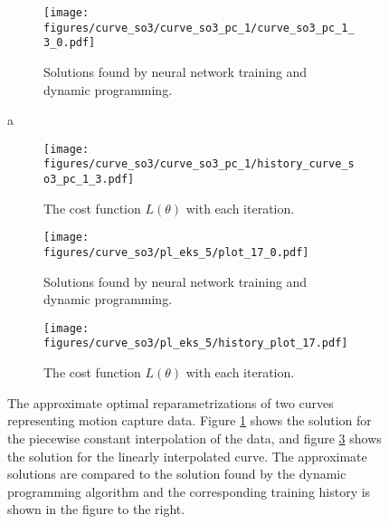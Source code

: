 

\begin{figure}[t]\label{fig:curve_1_so3_example}
    \begin{subfigure}[t]{0.5\textwidth}
        \centering
        \texttt{[image: figures/curve\_so3/curve\_so3\_pc\_1/curve\_so3\_pc\_1\_3\_0.pdf]}
        \caption{Solutions found by neural network training and dynamic programming.}
        \label{fig:curve_so3_pc_solution}
    \end{subfigure}a
    \begin{subfigure}[t]{0.5\textwidth}
        \centering
        \texttt{[image: figures/curve\_so3/curve\_so3\_pc\_1/history\_curve\_so3\_pc\_1\_3.pdf]}
        \caption{The cost function \(L(\theta)\) with each iteration.}
        \label{fig:curve_so3_pc_history}
    \end{subfigure}
    \begin{subfigure}[t]{0.5\textwidth}
        \centering
        \texttt{[image: figures/curve\_so3/pl\_eks\_5/plot\_17\_0.pdf]}
        \caption{Solutions found by neural network training and dynamic programming.}
        \label{fig:curve_so3_pl_solution}
    \end{subfigure}
    \begin{subfigure}[t]{0.5\textwidth}
        \centering
        \texttt{[image: figures/curve\_so3/pl\_eks\_5/history\_plot\_17.pdf]}
        \caption{The cost function \(L(\theta)\) with each iteration.}
        \label{fig:curve_so3_pl_history}
    \end{subfigure}
    \caption{The approximate optimal reparametrizations of two curves representing motion capture data. Figure \ref{fig:curve_so3_pc_solution} shows the solution for the piecewise constant interpolation of the data, and figure \ref{fig:curve_so3_pl_solution} shows the solution for the linearly interpolated curve. The approximate solutions are compared to the solution found by the dynamic programming algorithm and the corresponding training history is shown in the figure to the right.}
\end{figure}

